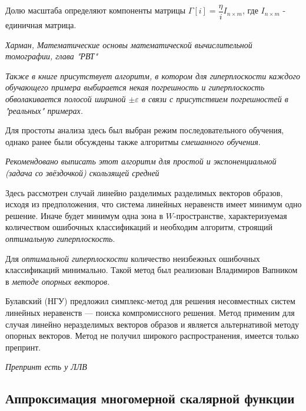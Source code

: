 \documentclass{article}
\numberwithin{equation}{subsection}
\begin{document}
Долю масштаба определяют компоненты матрицы $\Gamma[i]=\dfrac{\eta}{i} I_{n\times m}$, где $I_{n \times m}$ - единичная матрица.

\begin{myquote}
    \textit{Харман, Математические основы математической вычислительной томографии, глава "РВТ"}
\end{myquote}

\begin{myquote}
    \textit{Также в книге присутствует алгоритм, в котором для гиперплоскости каждого обучающего 
    примера выбирается некая погрешность и гиперплоскость обволакивается полосой
    шириной $\pm \varepsilon$ в связи с присутствием погрешностей в "реальных" примерах.}
\end{myquote}

Для простоты анализа здесь был выбран режим последовательного обучения, однако ранее были обсуждены 
также алгоритмы
\textit{смешанного обучения}.

\begin{myquote}
    \textit{Рекомендовано выписать этот алгоритм для простой и экспоненциальной (задача со звёздочкой) 
    скользящей средней}
\end{myquote}

Здесь рассмотрен случай линейно разделимых разделимых векторов образов, исходя из предположения, что система 
линейных неравенств имеет минимум одно решение.
Иначе будет минимум одна зона в $W$-пространстве, характеризуемая количеством ошибочных классификаций 
и необходим алгоритм, строящий \textit{оптимальную гиперплоскость}.

Для \textit{оптимальной гиперплоскости} количество неизбежных ошибочных классификаций минимально. 
Такой метод был реализован Владимиров Вапником в \textit{методе опорных векторов}.

Булавский (НГУ) предложил симплекс-метод для решения несовместных систем линейных неравенств --- 
поиска компромиссного решения. 
Метод применим для случая линейно неразделимых векторов образов и является альтернативой методу 
опорных векторов. 
Метод не получил широкого распространения, имеется только препринт.


\begin{myquote}
    \textit{Препринт есть у ЛЛВ}
\end{myquote}

\subsection{Аппроксимация многомерной скалярной функции}
\end{document}
